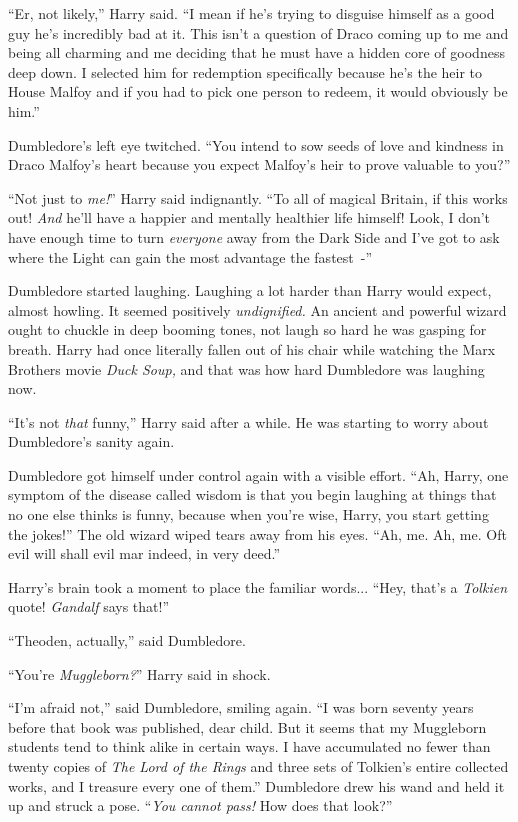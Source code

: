 ``Er, not likely,'' Harry said. ``I mean if he's trying to disguise himself as a good guy he's incredibly bad at it. This isn't a question of Draco coming up to me and being all charming and me deciding that he must have a hidden core of goodness deep down. I selected him for redemption specifically because he's the heir to House Malfoy and if you had to pick one person to redeem, it would obviously be him.''

Dumbledore's left eye twitched. ``You intend to sow seeds of love and kindness in Draco Malfoy's heart because you expect Malfoy's heir to prove valuable to you?''

``Not just to \emph{me!}'' Harry said indignantly. ``To all of magical Britain, if this works out! \emph{And} he'll have a happier and mentally healthier life himself! Look, I don't have enough time to turn \emph{everyone} away from the Dark Side and I've got to ask where the Light can gain the most advantage the fastest~-''

Dumbledore started laughing. Laughing a lot harder than Harry would expect, almost howling. It seemed positively \emph{undignified.} An ancient and powerful wizard ought to chuckle in deep booming tones, not laugh so hard he was gasping for breath. Harry had once literally fallen out of his chair while watching the Marx Brothers movie \emph{Duck Soup,} and that was how hard Dumbledore was laughing now.

``It's not \emph{that} funny,'' Harry said after a while. He was starting to worry about Dumbledore's sanity again.

Dumbledore got himself under control again with a visible effort. ``Ah, Harry, one symptom of the disease called wisdom is that you begin laughing at things that no one else thinks is funny, because when you're wise, Harry, you start getting the jokes!'' The old wizard wiped tears away from his eyes. ``Ah, me. Ah, me. Oft evil will shall evil mar indeed, in very deed.''

Harry's brain took a moment to place the familiar words... ``Hey, that's a \emph{Tolkien} quote! \emph{Gandalf} says that!''

``Theoden, actually,'' said Dumbledore.

``You're \emph{Muggleborn?}'' Harry said in shock.

``I'm afraid not,'' said Dumbledore, smiling again. ``I was born seventy years before that book was published, dear child. But it seems that my Muggleborn students tend to think alike in certain ways. I have accumulated no fewer than twenty copies of \emph{The Lord of the Rings} and three sets of Tolkien's entire collected works, and I treasure every one of them.'' Dumbledore drew his wand and held it up and struck a pose. ``\emph{You cannot pass!} How does that look?''

